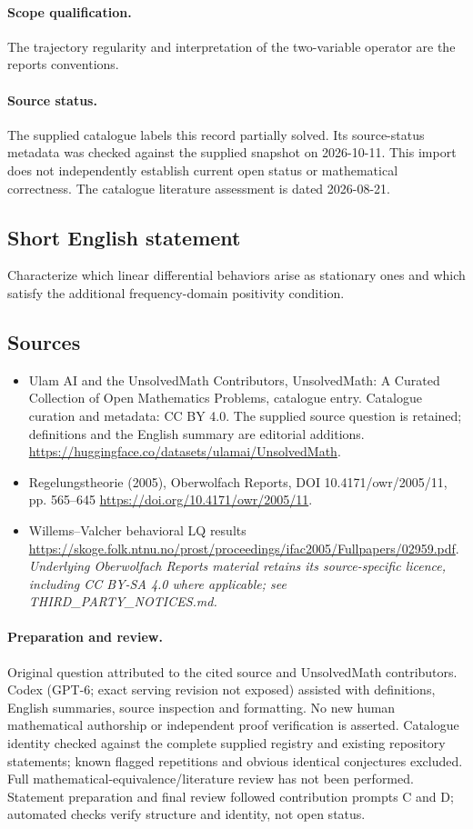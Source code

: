 \documentclass[11pt]{article}
\begin{document}
\paragraph{Scope qualification.}
The trajectory regularity and interpretation of the two-variable operator are the report\textquotesingle s conventions.
\paragraph{Source status.}
The supplied catalogue labels this record partially solved. Its source-status metadata was checked against the supplied snapshot on 2026-10-11. This import does not independently establish current open status or mathematical correctness. The catalogue literature assessment is dated 2026-08-21.
\subsection{Short English statement}
Characterize which linear differential behaviors arise as stationary ones and which satisfy the additional frequency-domain positivity condition.
\subsection{Sources}
\begin{itemize}
\item[S1] Ulam AI and the UnsolvedMath Contributors, UnsolvedMath: A Curated Collection of Open Mathematics Problems, catalogue entry. Catalogue curation and metadata: CC BY 4.0. The supplied source question is retained; definitions and the English summary are editorial additions.
\url{https://huggingface.co/datasets/ulamai/UnsolvedMath}.
\item[S2] Regelungstheorie (2005), Oberwolfach Reports, DOI 10.4171/owr/2005/11, pp. 565--645
\url{https://doi.org/10.4171/owr/2005/11}.
\item[S3] Willems--Valcher behavioral LQ results
\url{https://skoge.folk.ntnu.no/prost/proceedings/ifac2005/Fullpapers/02959.pdf}.
\textit{Underlying Oberwolfach Reports material retains its source-specific licence, including CC BY-SA 4.0 where applicable; see THIRD\_PARTY\_NOTICES.md.}
\end{itemize}
\paragraph{Preparation and review.}
Original question attributed to the cited source and UnsolvedMath contributors. Codex (GPT-6; exact serving revision not exposed) assisted with definitions, English summaries, source inspection and formatting. No new human mathematical authorship or independent proof verification is asserted. Catalogue identity checked against the complete supplied registry and existing repository statements; known flagged repetitions and obvious identical conjectures excluded. Full mathematical-equivalence/literature review has not been performed. Statement preparation and final review followed contribution prompts C and D; automated checks verify structure and identity, not open status.
\label{end:statement}
\end{document}
